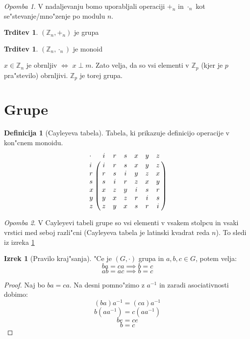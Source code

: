 \documentclass[11pt, a4paper]{article}
\theoremstyle{definition}
\newtheorem{defn}[counter]{Definicija}
\newtheorem{claim}[counter]{Trditev}
\newtheorem{theorem}[counter]{Izrek}
\theoremstyle{remark}
\newtheorem*{rem}{Opomba}
\newcommand{\Z}{\mathbb{Z}}
\let\bbordermatrix\bordermatrix
\begin{document}
	\begin{rem}
		V nadaljevanju bomo uporabljali operaciji $+_{n}$ in $\cdot_{n}$ kot se"stevanje/mno"zenje po modulu $n$.
	\end{rem}
	
	\begin{claim}
		$(\Z_n, +_n)$ je grupa
	\end{claim}
	\begin{claim}
		$(\Z_n, \cdot_n)$ je monoid
	\end{claim}
	$x \in \Z_n$ je obrnljiv $\iff$ $x \perp m$. Zato velja, da so vsi elementi v $\Z_p$ (kjer je $p$ pra"stevilo) obrnljivi. $\Z_p$ je torej grupa.
	
	\section{Grupe}
	\begin{defn}[Cayleyeva tabela]
		Tabela, ki prikazuje definicijo operacije v kon"cnem monoidu.
		$$
		\bbordermatrix{
			\cdot & i & r & s & x & y & z \cr
				i & i & r & s & x & y & z \cr
				r & r & s & i & y & z & x \cr
				s & s & i & r & z & x & y \cr
				x & x & z & y & i & s & r \cr
				y & y & x & z & r & i & s \cr
				z & z & y & x & s & r & i \cr
		}
		$$
	\end{defn}
	\begin{rem}
		V Cayleyevi tabeli grupe so vsi elementi v vsakem stolpcu in vsaki vrstici med seboj razli"cni (Cayleyeva tabela je latinski kvadrat reda $n$). To sledi iz izreka \ref{praviloKrajsanja}
	\end{rem}
	\begin{theorem}[Pravilo kraj"sanja]\label{praviloKrajsanja}
		"Ce je $(G, \cdot)$ grupa in $a, b, c \in G$, potem velja:
		\[ ba = ca \implies b = c \]
		\[ ab = ac \implies b = c \]
	\end{theorem}
	\begin{proof}
		Naj bo $ba = ca$. Na desni pomno"zimo z $a^{-1}$ in zaradi asociativnosti dobimo:
		\[ (ba)a^{-1} = (ca)a^{-1} \]
		\[ b(aa^{-1}) = c(aa^{-1}) \]
		\[ be = ce \]
		\[ b = c \]
	\end{proof}
\end{document}
